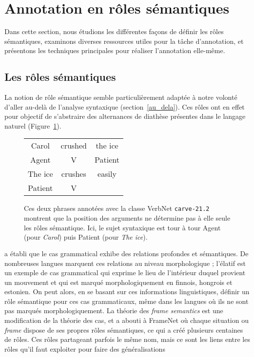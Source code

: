 \section{Annotation en rôles sémantiques}
\label{sec:srl}

Dans cette section, nous étudions les différentes façons de définir les rôles
sémantiques, examinons diverses ressources utiles pour la tâche d'annotation,
et présentons les techniques principales pour réaliser l'annotation elle-même.

\subsection{Les rôles sémantiques}
\label{subsec:roles_semantiques}

La notion de rôle sémantique semble particulièrement adaptée à notre volonté
d'aller au-delà de l'analyse syntaxique (section~\ref{au_dela}). Ces rôles ont
en effet pour objectif de s'abstraire des alternances de diathèse présentes
dans le langage naturel (Figure~\ref{fig:exemple_srl}).

\begin{figure}[ht]
    \centering
    \begin{tabular}{ccc}
        \toprule
        Carol & crushed   & the ice \\
        Agent & V         & Patient \\
        \midrule
        The ice & crushes & easily  \\
        Patient & V       &         \\
        \bottomrule
    \end{tabular}

    \caption{\label{fig:exemple_srl}Ces deux phrases annotées avec la classe
    VerbNet \texttt{carve-21.2} montrent que la position des arguments ne
détermine pas à elle seule les rôles sémantique. Ici, le sujet syntaxique est
tour à tour Agent (pour \textit{Carol}) puis Patient (pour \textit{The ice}).}
\end{figure}

\cite{fillmore1968case} a établi que le cas grammatical exhibe des relations
profondes et sémantiques. De nombreuses langues marquent ces relations au
niveau morphologique ; l'élatif est un exemple de cas grammatical qui exprime
le lieu de l'intérieur duquel provient un mouvement et qui est marqué
morphologiquement en finnois, hongrois et estonien. On peut alors, en se basant
sur ces informations linguistiques, définir un rôle sémantique pour ces cas
grammaticaux, même dans les langues où ils ne sont pas marqués
morphologiquement. La théorie des \textit{frame semantics}
\citep{fillmore1982frame} est une modification de la théorie des cas, et a
abouti à FrameNet où chaque situation ou \emph{frame} dispose de ses propres
rôles sémantiques, ce qui a créé plusieurs centaines de rôles. Ces rôles
partageant parfois le même nom, mais ce sont les liens entre les rôles qu'il
faut exploiter pour faire des généralisations \citep{litkowski2014framenet}

